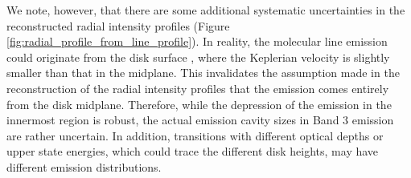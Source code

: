 \documentclass[linenumbers, twocolumn, twocolappendix, astrosymb, times]{aastex631}
\newcommand{\methanol}{CH$_3$OH\xspace}
\begin{document}
We note, however, that there are some additional systematic uncertainties in the reconstructed radial intensity profiles (Figure \ref{fig:radial_profile_from_line_profile}). In reality, the molecular line emission could originate from the disk surface \citep[or the warm molecular layer,][]{Aikawa2002, Law2021, Law2022, Law2023, PanequeCarreno2023}, where the Keplerian velocity is slightly smaller than that in the midplane. 
This invalidates the assumption made in the reconstruction of the radial intensity profiles that the emission comes entirely from the disk midplane. Therefore, while the depression of the emission in the innermost region is robust, the actual emission cavity sizes in Band 3 emission are rather uncertain. In addition, transitions with different optical depths or upper state energies, which could trace the different disk heights, may have different emission distributions. 

\end{document}
